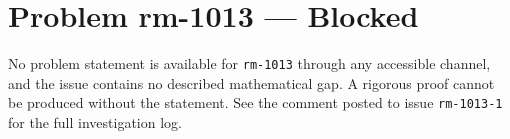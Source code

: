 \documentclass[12pt]{article}
\begin{document}
\section*{Problem rm-1013 --- Blocked}
No problem statement is available for \texttt{rm-1013} through any accessible
channel, and the issue contains no described mathematical gap. A rigorous
proof cannot be produced without the statement. See the comment posted to
issue \texttt{rm-1013-1} for the full investigation log.
\end{document}
